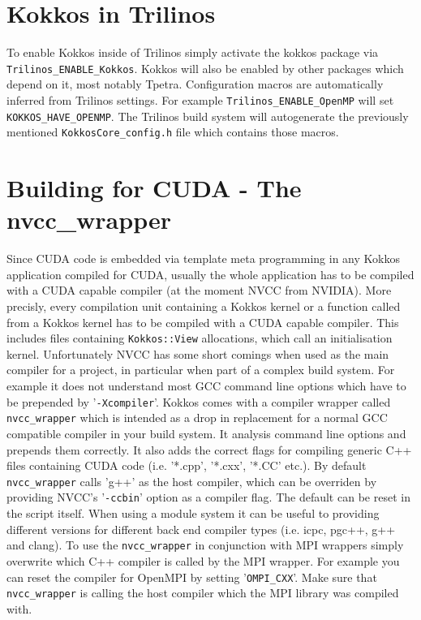 \section{Kokkos in Trilinos}
To enable Kokkos inside of Trilinos simply activate the kokkos package via \lstinline|Trilinos_ENABLE_Kokkos|.
Kokkos will also be enabled by other packages which depend on it, most notably Tpetra.
Configuration macros are automatically inferred from Trilinos settings. 
For example \lstinline|Trilinos_ENABLE_OpenMP| will set \lstinline|KOKKOS_HAVE_OPENMP|.
The Trilinos build system will autogenerate the previously mentioned \lstinline|KokkosCore_config.h| file which contains those macros. 
 
\section{Building for CUDA - The nvcc\_wrapper}
Since CUDA code is embedded via template meta programming in any Kokkos application compiled for CUDA, usually the whole application has to be compiled with a CUDA capable compiler (at the moment NVCC from NVIDIA). 
More precisly, every compilation unit containing a Kokkos kernel or a function called from a Kokkos kernel has to be compiled with a CUDA capable compiler. 
This includes files containing \lstinline|Kokkos::View| allocations, which call an initialisation kernel. 
Unfortunately NVCC has some short comings when used as the main compiler for a project, in particular when part of a complex build system.
For example it does not understand most GCC command line options which have to be prepended by '\lstinline|-Xcompiler|'. 
Kokkos comes with a compiler wrapper called \lstinline|nvcc_wrapper| which is intended as a drop in replacement for a normal GCC compatible compiler in your build system.
It analysis command line options and prepends them correctly. 
It also adds the correct flags for compiling generic C++ files containing CUDA code (i.e. '*.cpp', '*.cxx', '*.CC' etc.).
By default \lstinline|nvcc_wrapper| calls 'g++' as the host compiler, which can be overriden by providing NVCC's '\lstinline|-ccbin|' option as a compiler flag.
The default can be reset in the script itself. 
When using a module system it can be useful to providing different versions for different back end compiler types (i.e. icpc, pgc++, g++ and clang).
To use the \lstinline|nvcc_wrapper| in conjunction with MPI wrappers simply overwrite which C++ compiler is called by the MPI wrapper. 
For example you can reset the compiler for OpenMPI by setting '\lstinline|OMPI_CXX|'.
Make sure that \lstinline|nvcc_wrapper| is calling the host compiler which the MPI library was compiled with. 

